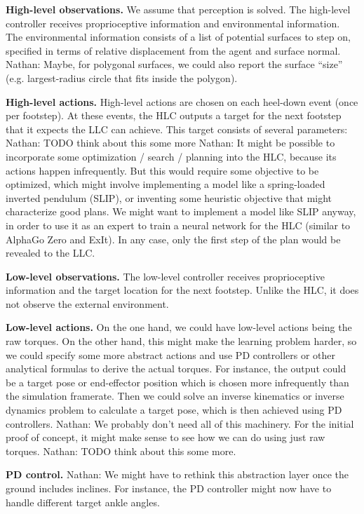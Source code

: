 \documentclass[a4paper]{article}
\newcommand{\nhatch}[1]{{\leavevmode\color{blue} Nathan: #1}}
\begin{document}
\textbf{High-level observations.}
We assume that perception is solved.
The high-level controller receives proprioceptive information and environmental information.
The environmental information consists of a list of potential surfaces to step on, specified in terms of relative displacement from the agent and surface normal.
\nhatch{Maybe, for polygonal surfaces, we could also report the surface ``size'' (e.g. largest-radius circle that fits inside the polygon).}

\textbf{High-level actions.}
High-level actions are chosen on each heel-down event (once per footstep).
At these events, the HLC outputs a target for the next footstep that it expects the LLC can achieve.
This target consists of several parameters: \nhatch{TODO think about this some more}
\nhatch{It might be possible to incorporate some optimization / search / planning into the HLC, because its actions happen infrequently.
But this would require some objective to be optimized, which might involve implementing a model like a spring-loaded inverted pendulum (SLIP), or inventing some heuristic objective that might characterize good plans.
We might want to implement a model like SLIP anyway, in order to use it as an expert to train a neural network for the HLC (similar to AlphaGo Zero and ExIt).
In any case, only the first step of the plan would be revealed to the LLC.}

\textbf{Low-level observations.}
The low-level controller receives proprioceptive information and the target location for the next footstep.
Unlike the HLC, it does not observe the external environment.

\textbf{Low-level actions.}
On the one hand, we could have low-level actions being the raw torques.
On the other hand, this might make the learning problem harder, so we could specify some more abstract actions and use PD controllers or other analytical formulas to derive the actual torques.
For instance, the output could be a target pose or end-effector position which is chosen more infrequently than the simulation framerate.
Then we could solve an inverse kinematics or inverse dynamics problem to calculate a target pose, which is then achieved using PD controllers.
\nhatch{We probably don't need all of this machinery.
For the initial proof of concept, it might make sense to see how we can do using just raw torques.}
\nhatch{TODO think about this some more.}

\textbf{PD control.}
\nhatch{We might have to rethink this abstraction layer once the ground includes inclines.
For instance, the PD controller might now have to handle different target ankle angles.}
\end{document}
